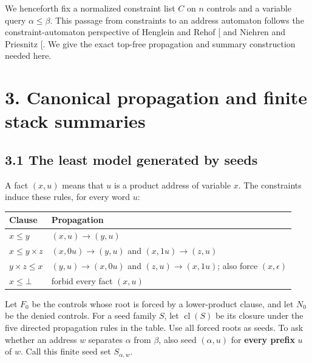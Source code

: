 \documentclass[
  11pt,
  a4paper,
]{article}
\newcounter{none} %
\begin{document}
We henceforth fix a normalized constraint list \(C\) on \(n\) controls
and a variable query \(\alpha\le\beta\). This passage from constraints
to an address automaton follows the constraint-automaton perspective of
Henglein and Rehof {[}\citeproc{ref-HR98}{2, sec. 3}{]} and Niehren and
Priesnitz {[}\citeproc{ref-NP03}{3}{]}. We give the exact top-free
propagation and summary construction needed here.


\section{3. Canonical propagation and finite stack
summaries}\label{canonical-propagation-and-finite-stack-summaries}

\subsection{3.1 The least model generated by
seeds}\label{the-least-model-generated-by-seeds}

A fact \((x,u)\) means that \(u\) is a product address of variable
\(x\). The constraints induce these rules, for every word \(u\):

{\def\LTcaptype{none} %
\begin{longtable}[]{@{}
  >{\raggedright\arraybackslash}p{}
  >{\raggedright\arraybackslash}p{}@{}}
\toprule\noalign{}
\begin{minipage}[b]{\linewidth}\raggedright
Clause
\end{minipage} & \begin{minipage}[b]{\linewidth}\raggedright
Propagation
\end{minipage} \\
\midrule\noalign{}
\endhead
\bottomrule\noalign{}
\endlastfoot
\(x\le y\) & \((x,u)\to(y,u)\) \\
\(x\le y\times z\) & \((x,0u)\to(y,u)\) and \((x,1u)\to(z,u)\) \\
\(y\times z\le x\) & \((y,u)\to(x,0u)\) and \((z,u)\to(x,1u)\); also
force \((x,\epsilon)\) \\
\(x\le\bot\) & forbid every fact \((x,u)\) \\
\end{longtable}
}

Let \(F_0\) be the controls whose root is forced by a lower-product
clause, and let \(N_0\) be the denied controls. For a seed family \(S\),
let \(\operatorname{cl}(S)\) be its closure under the five directed
propagation rules in the table. Use all forced roots as seeds. To ask
whether an address \(w\) separates \(\alpha\) from \(\beta\), also seed
\((\alpha,u)\) for \textbf{every prefix} \(u\) of \(w\). Call this
finite seed set \(S_{\alpha,w}\).
\end{document}
